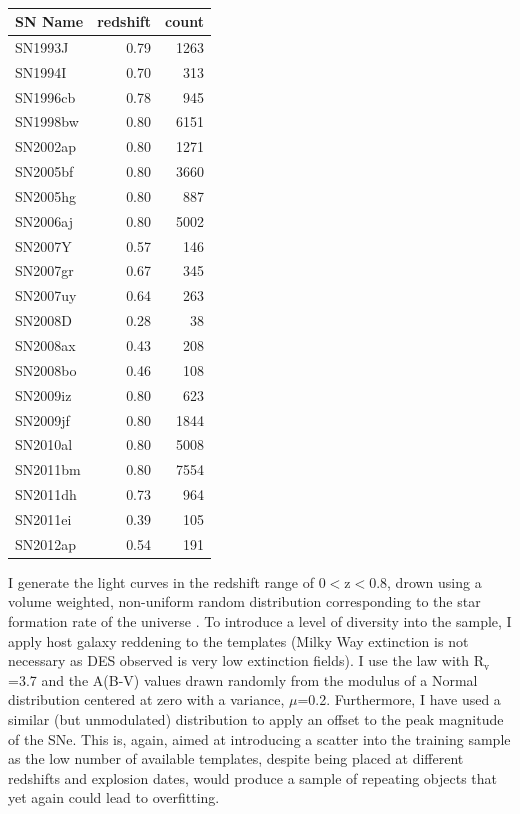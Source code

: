 \begin{table}
  \caption{}
  \label{tab:IbcTemplates}
  \centering
  \begin{tabular}{l|r|r}
    SN Name  & redshift & count \\
    \hline
    SN1993J  & 0.79 & 1263 \\
    SN1994I  & 0.70 &  313 \\
    SN1996cb & 0.78 &  945 \\
    SN1998bw & 0.80 & 6151 \\
    SN2002ap & 0.80 & 1271 \\
    SN2005bf & 0.80 & 3660 \\
    SN2005hg & 0.80 &  887 \\
    SN2006aj & 0.80 & 5002 \\
    SN2007Y  & 0.57 &  146 \\
    SN2007gr & 0.67 &  345 \\
    SN2007uy & 0.64 &  263 \\
    SN2008D  & 0.28 &   38 \\
    SN2008ax & 0.43 &  208 \\
    SN2008bo & 0.46 &  108 \\
    SN2009iz & 0.80 &  623 \\
    SN2009jf & 0.80 & 1844 \\
    SN2010al & 0.80 & 5008 \\
    SN2011bm & 0.80 & 7554 \\
    SN2011dh & 0.73 &  964 \\
    SN2011ei & 0.39 &  105 \\
    SN2012ap & 0.54 &  191 \\
    \hline
  \end{tabular}
\end{table}

I generate the light curves in the redshift range of 0$<$z$<$0.8, drown using a volume weighted, non-uniform random distribution corresponding to the star formation rate of the universe \citep{Hopkins2006}. To introduce a level of diversity into the sample, I apply host galaxy reddening to the templates (Milky Way extinction is not necessary as DES observed is very low extinction fields). I use the \citet{Cardelli1989} law with R$_\mathrm{v}$=3.7 and the A(B-V) values drawn randomly from the modulus of a Normal distribution centered at zero with a variance, $\mu$=0.2. Furthermore, I have used a similar (but unmodulated) distribution to apply an offset to the peak magnitude of the SNe. This is, again, aimed at introducing a scatter into the training sample as the low number of available templates, despite being placed at different redshifts and explosion dates, would produce a sample of repeating objects that yet again could lead to overfitting.

